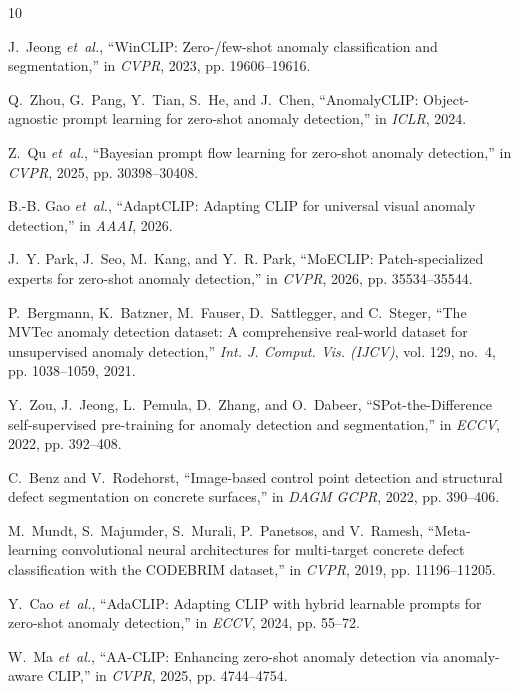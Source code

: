 \documentclass[conference]{IEEEtran}
\begin{document}
\begin{thebibliography}{10}

J.~Jeong \emph{et~al.}, ``{WinCLIP}: Zero-/few-shot anomaly classification and segmentation,'' in \emph{CVPR}, 2023, pp. 19606--19616.

Q.~Zhou, G.~Pang, Y.~Tian, S.~He, and J.~Chen, ``{AnomalyCLIP}: Object-agnostic prompt learning for zero-shot anomaly detection,'' in \emph{ICLR}, 2024.

Z.~Qu \emph{et~al.}, ``Bayesian prompt flow learning for zero-shot anomaly detection,'' in \emph{CVPR}, 2025, pp. 30398--30408.

B.-B. Gao \emph{et~al.}, ``{AdaptCLIP}: Adapting {CLIP} for universal visual anomaly detection,'' in \emph{AAAI}, 2026.

J.~Y. Park, J.~Seo, M.~Kang, and Y.~R. Park, ``{MoECLIP}: Patch-specialized experts for zero-shot anomaly detection,'' in \emph{CVPR}, 2026, pp. 35534--35544.

P.~Bergmann, K.~Batzner, M.~Fauser, D.~Sattlegger, and C.~Steger, ``The {MVTec} anomaly detection dataset: A comprehensive real-world dataset for unsupervised anomaly detection,'' \emph{Int. J. Comput. Vis. (IJCV)}, vol. 129, no.~4, pp. 1038--1059, 2021.

Y.~Zou, J.~Jeong, L.~Pemula, D.~Zhang, and O.~Dabeer, ``{SPot-the-Difference} self-supervised pre-training for anomaly detection and segmentation,'' in \emph{ECCV}, 2022, pp. 392--408.

C.~Benz and V.~Rodehorst, ``Image-based control point detection and structural defect segmentation on concrete surfaces,'' in \emph{DAGM GCPR}, 2022, pp. 390--406.

M.~Mundt, S.~Majumder, S.~Murali, P.~Panetsos, and V.~Ramesh, ``Meta-learning convolutional neural architectures for multi-target concrete defect classification with the {CODEBRIM} dataset,'' in \emph{CVPR}, 2019, pp. 11196--11205.

Y.~Cao \emph{et~al.}, ``{AdaCLIP}: Adapting {CLIP} with hybrid learnable prompts for zero-shot anomaly detection,'' in \emph{ECCV}, 2024, pp. 55--72.

W.~Ma \emph{et~al.}, ``{AA-CLIP}: Enhancing zero-shot anomaly detection via anomaly-aware {CLIP},'' in \emph{CVPR}, 2025, pp. 4744--4754.


\end{thebibliography}
\end{document}
